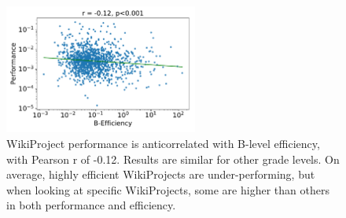 \begin{figure}[h!]
\centering
\includegraphics[width=2.5in,height=1.67in]{fig-perf-eff.pdf}
\caption{
WikiProject performance is anticorrelated with B-level efficiency,
with Pearson r of -0.12.
Results are similar for other grade levels.
On average, highly efficient WikiProjects are under-performing,
but when looking at specific WikiProjects,
some are higher than others in both performance and efficiency.
\label{fig:eff-perf}
}
\end{figure}


